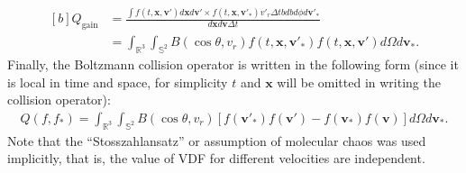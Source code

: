 \begin{equation}
\begin{aligned}[b]
Q_{\text{gain}}&=\frac{\int{}f(t,\bm{x},\bm{v}')d\bm{x}d\bm{v}'\times
	f(t,\bm{x},\bm{v}'_\ast)v'_r\Delta{t}bdbd\phi{}d\bm{v}'_\ast}{d\bm{x}d\bm{v}\Delta{t}}\\
&=\int_{\mathbb{R}^3}\int_{\mathbb{S}^{2}}
B(\cos\theta,v_r)
f(t,\bm{x},\bm{v}'_{\ast})f(t,\bm{x},\bm{v}')
d\Omega
d\bm{v}_\ast.
\end{aligned}
\end{equation}
Finally, the Boltzmann collision operator  is written in the following form (since it is local in time and space, for simplicity $t$ and $\bm{x}$ will be omitted in writing the collision operator):
\begin{eqnarray}\label{chapter1_collision}
Q(f,f_*)=\int_{\mathbb{R}^3}\int_{\mathbb{S}^{2}}
B(\cos\theta,v_r)
[f(\bm{v}'_{\ast})f(\bm{v}')-
f(\bm{v}_{\ast})f(\bm{v})]
d\Omega
d\bm{v}_\ast.
\end{eqnarray}
Note that the ``Stosszahlansatz'' or assumption of molecular chaos was used implicitly, that is, the value of VDF for different velocities are independent. 

%



